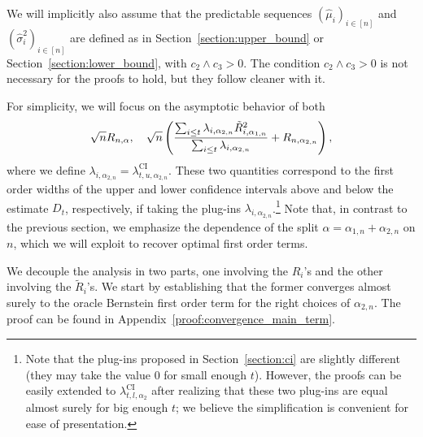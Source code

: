 We will implicitly also assume that the predictable sequences $(\widehat\mu_i)_{i \in [n]}$ and $(\widehat\sigma_i^2)_{i \in [n]}$ are defined as in Section~\ref{section:upper_bound} or Section~\ref{section:lower_bound}, with $c_2 \wedge c_3 > 0$.
The condition $c_2 \wedge c_3 > 0$ is not necessary for the proofs to hold, but they follow cleaner with it. 

For simplicity, we will focus on the asymptotic behavior of both 
\begin{align*}
    \sqrt{n} R_{n, \alpha}, \quad \sqrt{n} \left( \frac{\sum_{i \leq t}\lambda_{i, \alpha_{2, n}} \tilde R_{i, \alpha_{1, n}}^2}{\sum_{i \leq t} \lambda_{i, \alpha_{2, n}}} + R_{n, \alpha_{2, n}} \right),
\end{align*}
where we define $\lambda_{i, \alpha_{2, n}} = \lambda_{t,u, \alpha_{2, n}}^{\text{CI}}$. These two quantities correspond to the first order widths of the upper and lower confidence intervals above and below the estimate $D_t$, respectively, if taking the plug-ins $\lambda_{i, \alpha_{2, n}}$.\footnote{Note that the plug-ins proposed in Section~\ref{section:ci} are slightly different (they may take the value $0$ for small enough $t$). However, the proofs can be easily extended to $\lambda_{t,l, \alpha_2}^{\text{CI}}$  after realizing that these two plug-ins are equal almost surely for big enough $t$; we believe the simplification is convenient for ease of presentation.} Note that, in contrast to the previous section, we emphasize the dependence of the split $\alpha = \alpha_{1, n} + \alpha_{2, n}$ on $n$, which we will exploit to recover optimal first order terms.



We decouple the analysis in two parts, one involving the $R_i$'s and the other involving the $\tilde R_i$'s.  We start by establishing that the former converges almost surely to the oracle Bernstein first order term for the right choices of $\alpha_{2, n}$. The proof can be found in Appendix~\ref{proof:convergence_main_term}.


